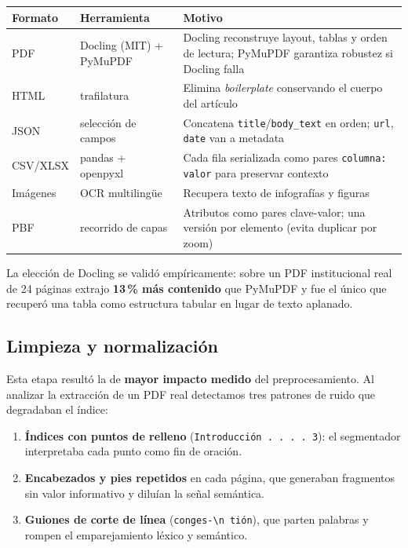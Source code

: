 \documentclass[10pt,a4paper]{article}
\begin{document}
\begin{center}\small
\begin{tabularx}{\textwidth}{@{}l l X@{}}
\toprule
\textbf{Formato} & \textbf{Herramienta} & \textbf{Motivo} \\
\midrule
PDF & Docling (MIT) + PyMuPDF & Docling reconstruye layout, tablas y orden de lectura; PyMuPDF garantiza robustez si Docling falla \\
HTML & trafilatura & Elimina \emph{boilerplate} conservando el cuerpo del artículo \\
JSON & selección de campos & Concatena \texttt{title}/\texttt{body\_text} en orden; \texttt{url}, \texttt{date} van a metadata \\
CSV/XLSX & pandas + openpyxl & Cada fila serializada como pares \texttt{columna: valor} para preservar contexto \\
Imágenes & OCR multilingüe & Recupera texto de infografías y figuras \\
PBF & recorrido de capas & Atributos como pares clave-valor; una versión por elemento (evita duplicar por zoom) \\
\bottomrule
\end{tabularx}
\end{center}

La elección de Docling se validó empíricamente: sobre un PDF institucional real de 24 páginas
extrajo \textbf{13\,\% más contenido} que PyMuPDF y fue el único que recuperó una tabla como
estructura tabular en lugar de texto aplanado.

\subsection{Limpieza y normalización}

Esta etapa resultó la de \textbf{mayor impacto medido} del preprocesamiento. Al analizar la
extracción de un PDF real detectamos tres patrones de ruido que degradaban el índice:

\begin{enumerate}
\item \textbf{Índices con puntos de relleno} (\texttt{Introducción . . . . 3}): el segmentador
interpretaba cada punto como fin de oración.
\item \textbf{Encabezados y pies repetidos} en cada página, que generaban fragmentos sin valor
informativo y diluían la señal semántica.
\item \textbf{Guiones de corte de línea} (\texttt{conges-\textbackslash n tión}), que parten
palabras y rompen el emparejamiento léxico y semántico.
\end{enumerate}
\end{document}
